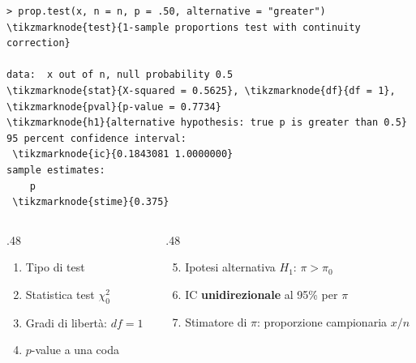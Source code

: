 \documentclass[
  ignorenonframetext,
  compress, aspectratio=149]{beamer}
\begin{document}
\begin{frame}[fragile]{}
\label{section-14}
\begin{Verbatim}[commandchars=\\\{\}, fontsize=\scriptsize, frame=single, framesep=2mm]
> prop.test(x, n = n, p = .50, alternative = "greater")
\tikzmarknode{test}{1-sample proportions test with continuity correction}

data:  x out of n, null probability 0.5
\tikzmarknode{stat}{X-squared = 0.5625}, \tikzmarknode{df}{df = 1}, \tikzmarknode{pval}{p-value = 0.7734}
\tikzmarknode{h1}{alternative hypothesis: true p is greater than 0.5}
95 percent confidence interval:
 \tikzmarknode{ic}{0.1843081 1.0000000}
sample estimates:
    p
 \tikzmarknode{stime}{0.375}
\end{Verbatim}

\vspace{-3mm}
\begin{columns}[T]
\begin{column}{.48\textwidth}
\footnotesize
\begin{enumerate}
  \item Tipo di test
  \item Statistica test $\chi^2_0$
  \item Gradi di libertà: $df = 1$
  \item $p$-value a una coda
\end{enumerate}
\end{column}
\begin{column}{.48\textwidth}
\footnotesize
\begin{enumerate}
  \setcounter{enumi}{4}
  \item Ipotesi alternativa $H_1$: $\pi > \pi_0$
  \item IC \textbf{unidirezionale} al 95\% per $\pi$
  \item Stimatore di $\pi$: proporzione campionaria $x/n$
\end{enumerate}
\end{column}
\end{columns}
\end{frame}
\end{document}
